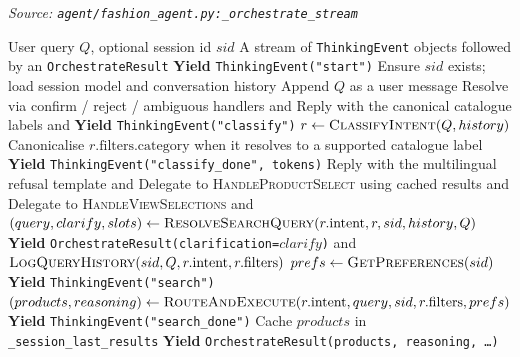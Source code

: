 \begin{algorithm}[H]
\caption{Direct Routing Orchestration (Streaming)}\label{alg:routing}
\textit{Source: \texttt{agent/fashion\_agent.py:\_orchestrate\_stream}}
\begin{algorithmic}[1]
\Require User query $Q$, optional session id $sid$
\Ensure A stream of \texttt{ThinkingEvent} objects followed by an \texttt{OrchestrateResult}
    \State \textbf{Yield} \texttt{ThinkingEvent("start")}
    \State Ensure $sid$ exists; load session model and conversation history
    \State Append $Q$ as a user message
        \State Resolve via confirm / reject / ambiguous handlers and \Return
    \EndIf
        \State Reply with the canonical catalogue labels and \Return
    \EndIf
    \State \textbf{Yield} \texttt{ThinkingEvent("classify")}
    \State $r \gets \textsc{ClassifyIntent}(Q, history)$ 
    \State Canonicalise $r.\text{filters.category}$ when it resolves to a supported catalogue label
    \State \textbf{Yield} \texttt{ThinkingEvent("classify\_done", tokens)}
        \State Reply with the multilingual refusal template and \Return
        \State Delegate to \textsc{HandleProductSelect} using cached results and \Return
        \State Delegate to \textsc{HandleViewSelections} and \Return
    \EndIf
    \State $(query, clarify, slots) \gets \textsc{ResolveSearchQuery}(r.\text{intent}, r, sid, history, Q)$
        \State \textbf{Yield} \texttt{OrchestrateResult(clarification=$clarify$)} and \Return
    \EndIf
    \State $\textsc{LogQueryHistory}(sid, Q, r.\text{intent}, r.\text{filters})$ 
    \State $prefs \gets \textsc{GetPreferences}(sid)$ 
    \State \textbf{Yield} \texttt{ThinkingEvent("search")}
    \State $(products, reasoning) \gets \textsc{RouteAndExecute}(r.\text{intent}, query, sid, r.\text{filters}, prefs)$
    \State \textbf{Yield} \texttt{ThinkingEvent("search\_done")}
    \State Cache $products$ in \texttt{\_session\_last\_results}
    \State \textbf{Yield} \texttt{OrchestrateResult(products, reasoning, \ldots)}
\EndProcedure
\end{algorithmic}
\end{algorithm}

